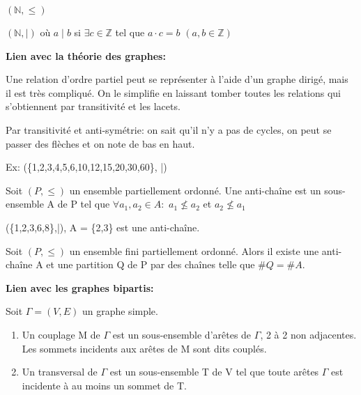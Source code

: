 \begin{exmp}
$(\mathbb{N},\leq)$

\hspace{-0.55cm}$(\mathbb{N},\mid)$ où $a \mid b$ si $\exists c \in \mathbb{Z}$ tel que $a \cdot c = b$ $(a,b \in \mathbb{Z})$
\end{exmp}


\textbf{Lien avec la théorie des graphes:} 

Une relation d'ordre partiel peut se représenter à l'aide d'un graphe dirigé, mais il est très compliqué. On le simplifie en laissant tomber toutes les relations qui s’obtiennent par transitivité et les lacets.

Par transitivité et anti-symétrie: on sait qu'il n'y a pas de cycles, on peut se passer des flèches et on note de bas en haut.

Ex: (\{1,2,3,4,5,6,10,12,15,20,30,60\}, |)


\newpage

\begin{defn}
Soit $(P,\leq)$ un ensemble partiellement ordonné. Une anti-chaîne est un sous-ensemble A de P tel que $\forall a_{1},a_{2} \in A: $ $ a_{1} \nleqslant a_{2} $ et $ a_{2} \nleqslant a_{1} $
\end{defn}

\begin{exmp}
(\{1,2,3,6,8\},|), A = \{2,3\} est une anti-chaîne.
\end{exmp}

\begin{thrm}[Dilworth]
Soit $(P,\leq)$ un ensemble fini partiellement ordonné. Alors il existe une anti-chaîne A et une partition Q de P par des chaînes telle que $\#Q = \#A$.
\end{thrm}

\textbf{Lien avec les graphes bipartis:}

\begin{thrm}
Soit $\Gamma = (V,E)$ un graphe simple. 
	\begin{enumerate}
		\item Un couplage M de $\Gamma$ est un sous-ensemble d'arêtes de $\Gamma$, 2 à 2 non adjacentes. Les sommets incidents aux arêtes de M sont dits couplés.
		\item Un transversal de $\Gamma$ est un sous-ensemble T de V tel que toute arêtes $\Gamma$ est incidente à au moins un sommet de T.
	\end{enumerate}
\end{thrm}

